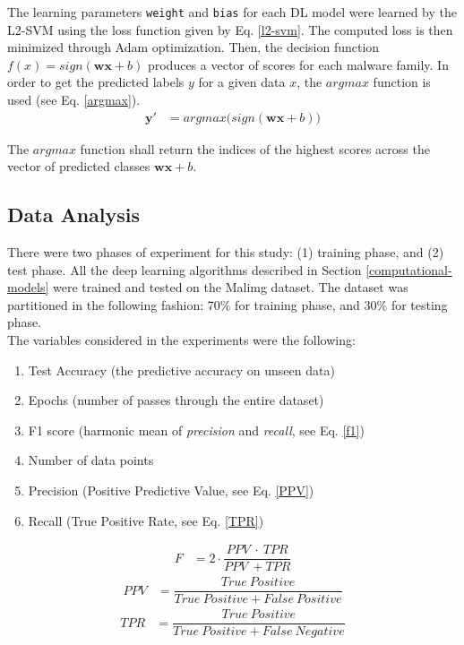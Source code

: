 \documentclass[sigconf]{acmart}
\renewcommand{\vec}[1]{\mathbf{#1}}
\begin{document}
\indent The learning parameters \texttt{weight} and \texttt{bias} for each DL model were learned by the L2-SVM using the loss function given by Eq. \ref{l2-svm}. The computed loss is then minimized through Adam\cite{Kingma} optimization. Then, the decision function $f(x) = sign(\vec{w}\vec{x} + b)$ produces a vector of scores for each malware family. In order to get the predicted labels $y$ for a given data $x$, the $argmax$ function is used (see Eq. \ref{argmax}).
\begin{align}\label{argmax}
\vec{y'}	&=	argmax\big(sign(\vec{w}\vec{x} + b)\big)
\end{align}

\indent	The $argmax$ function shall return the indices of the highest scores across the vector of predicted classes $\vec{w}\vec{x} + b$.

\subsection{Data Analysis}
There were two phases of experiment for this study: (1) training phase, and (2) test phase. All the deep learning algorithms described in Section \ref{computational-models} were trained and tested on the Malimg dataset\cite{nataraj2011malware}. The dataset was partitioned in the following fashion: 70\% for training phase, and 30\% for testing phase.\\
\indent	The variables considered in the experiments were the following: 
\begin{enumerate}
	\item Test Accuracy (the predictive accuracy on unseen data)
	\item Epochs (number of passes through the entire dataset)
	\item F1 score (harmonic mean of \textit{precision} and \textit{recall}, see Eq. \ref{f1})
	\item Number of data points
	\item Precision (Positive Predictive Value, see Eq. \ref{PPV}) 
	\item Recall (True Positive Rate, see Eq. \ref{TPR})
\end{enumerate}

\begin{align}\label{f1}
F	&=	2 \cdot \dfrac{PPV\ \cdot \ TPR}{PPV\ + TPR}
\end{align}
\begin{align}\label{PPV}
PPV	&=	\dfrac{True\ Positive}{True\ Positive + False\ Positive}
\end{align}
\begin{align}\label{TPR}
TPR	&=	\dfrac{True\ Positive}{True\ Positive + False\ Negative}
\end{align}
\end{document}
